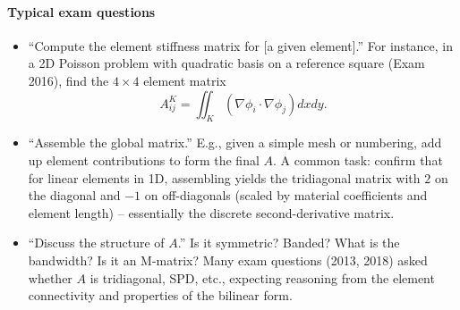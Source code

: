 \documentclass[a4paper,11pt]{report}
\begin{document}
\paragraph{Typical exam questions}
\begin{itemize}
    \item \enquote{Compute the element stiffness matrix for [a given element].}
          For instance, in a 2D Poisson problem with quadratic basis on a reference square (Exam 2016), find the $4\times4$ element matrix
          $$
              A^K_{ij} = \iint_K (\nabla \phi_i \cdot \nabla \phi_j)dxdy.
          $$
    \item \enquote{Assemble the global matrix.}
          E.g., given a simple mesh or numbering, add up element contributions to form the final $A$. A common task: confirm that for linear elements in 1D, assembling yields the tridiagonal matrix with $2$ on the diagonal and $-1$ on off-diagonals (scaled by material coefficients and element length) -- essentially the discrete second-derivative matrix.
    \item \enquote{Discuss the structure of $A$.}
          Is it symmetric? Banded? What is the bandwidth? Is it an M-matrix? Many exam questions (2013, 2018) asked whether $A$ is tridiagonal, SPD, etc., expecting reasoning from the element connectivity and properties of the bilinear form.
\end{itemize}
\end{document}
